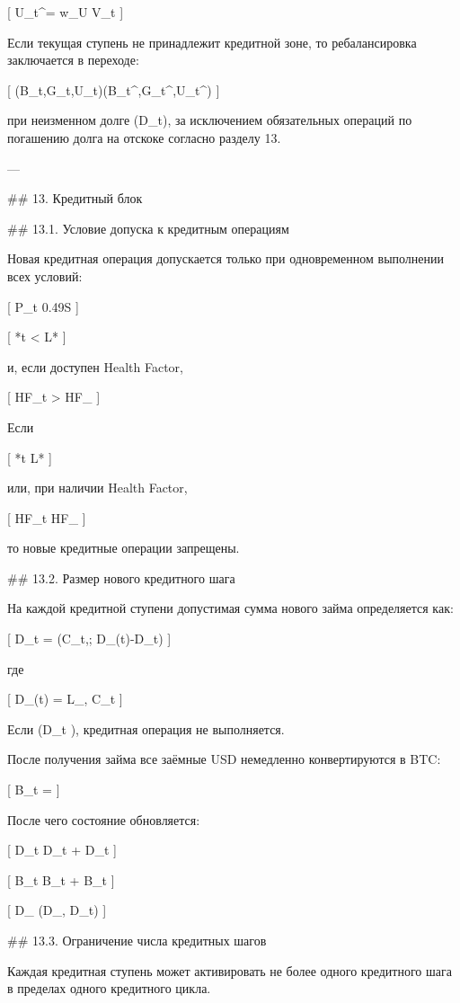 [
U_t^\star = w_U V_t
]

Если текущая ступень не принадлежит кредитной зоне, то ребалансировка заключается в переходе:

[
(B_t,G_t,U_t)\to(B_t^\star,G_t^\star,U_t^\star)
]

при неизменном долге (D_t), за исключением обязательных операций по погашению долга на отскоке согласно разделу 13.

---

## 13. Кредитный блок

## 13.1. Условие допуска к кредитным операциям

Новая кредитная операция допускается только при одновременном выполнении всех условий:

[
P_t \le 0.49S
]

[
*t < L*{}
]

и, если доступен Health Factor,

[
HF_t > HF_{}
]

Если

[
*t \ge L*{}
]

или, при наличии Health Factor,

[
HF_t \le HF_{}
]

то новые кредитные операции запрещены.

## 13.2. Размер нового кредитного шага

На каждой кредитной ступени допустимая сумма нового займа определяется как:

[
\Delta D_t = \min\left(\alpha C_t,; D_{\max}(t)-D_t\right)
]

где

[
D_{\max}(t) = L_{}, C_t
]

Если (\Delta D_t ), кредитная операция не выполняется.

После получения займа все заёмные USD немедленно конвертируются в BTC:

[
\Delta B_t = 
]

После чего состояние обновляется:

[
D_t \leftarrow D_t + \Delta D_t
]

[
B_t \leftarrow B_t + \Delta B_t
]

[
D_{} \leftarrow \max(D_{}, D_t)
]

## 13.3. Ограничение числа кредитных шагов

Каждая кредитная ступень может активировать не более одного кредитного шага в пределах одного кредитного цикла.

